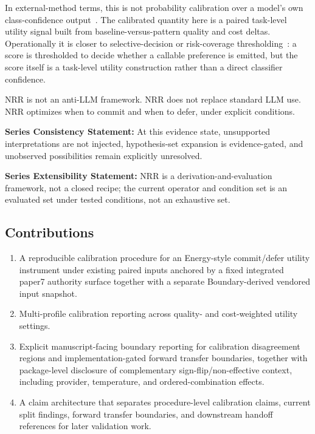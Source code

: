 \documentclass[11pt,a4paper]{article}
\begin{document}
In external-method terms, this is not probability calibration over a model's own
class-confidence output~\cite{guo2017calibration}. The calibrated quantity here
is a paired task-level utility signal built from baseline-versus-pattern quality
and cost deltas. Operationally it is closer to selective-decision or
risk-coverage thresholding~\cite{geifman2017selective}: a score is thresholded
to decide whether a callable preference is emitted, but the score itself is a
task-level utility construction rather than a direct classifier confidence.

NRR is not an anti-LLM framework.
NRR does not replace standard LLM use.
NRR optimizes when to commit and when to defer, under explicit conditions.

\textbf{Series Consistency Statement:}
At this evidence state, unsupported interpretations are not injected, hypothesis-set expansion is evidence-gated, and unobserved possibilities remain explicitly unresolved.

\textbf{Series Extensibility Statement:}
NRR is a derivation-and-evaluation framework, not a closed recipe; the current operator and condition set is an evaluated set under tested conditions, not an exhaustive set.

\subsection{Contributions}

\begin{enumerate}
  \item A reproducible calibration procedure for an Energy-style commit/defer utility instrument under existing paired inputs anchored by a fixed integrated paper7 authority surface together with a separate Boundary-derived vendored input snapshot.
  \item Multi-profile calibration reporting across quality- and cost-weighted utility settings.
  \item Explicit manuscript-facing boundary reporting for calibration disagreement regions and implementation-gated forward transfer boundaries, together with package-level disclosure of complementary sign-flip/non-effective context, including provider, temperature, and ordered-combination effects.
  \item A claim architecture that separates procedure-level calibration claims, current split findings, forward transfer boundaries, and downstream handoff references for later validation work.
\end{enumerate}
\end{document}
